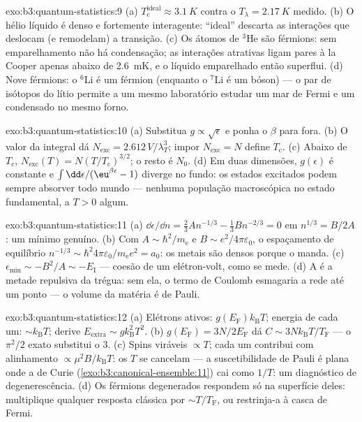 \begin{solution}{exo:b3:quantum-statistics:9}
(a) $T_{\text{c}}^{\text{ideal}} \approx \qty{3.1}{K}$ contra o
$T_\lambda = \qty{2.17}{K}$ medido. (b) O hélio líquido é denso
e fortemente interagente: ``ideal'' descarta as interações que
deslocam (e remodelam) a transição. (c) Os átomos de $^3$He são férmions:
sem emparelhamento não há condensação; as interações atrativas ligam
pares à la Cooper apenas abaixo de \qty{2.6}{mK}, e o líquido emparelhado
então superflui. (d) Nove férmions: o $^6$Li é um férmion (enquanto
o $^7$Li é um bóson) --- o par de isótopos do lítio permite a um mesmo
laboratório estudar um mar de Fermi e um condensado no mesmo forno.
\end{solution}

\begin{solution}{exo:b3:quantum-statistics:10}
(a) Substitua $g \propto \sqrt\epsilon$ e ponha o $\beta$ para fora.
(b) O valor da integral dá $N_{\text{exc}} =
2.612\,V/\lambda_T^3$; impor $N_{\text{exc}} = N$ define
$T_{\text{c}}$. (c) Abaixo de $T_{\text{c}}$, $N_{\text{exc}}(T) =
N(T/T_{\text{c}})^{3/2}$; o resto é $N_0$. (d) Em duas
dimensões, $g(\epsilon)$ é constante e $\int\dd\epsilon/(\eu^{
\beta\epsilon} - 1)$ diverge no fundo: os estados excitados
podem sempre absorver todo mundo --- nenhuma população macroscópica no
estado fundamental, a $T > 0$ algum.
\end{solution}

\begin{solution}{exo:b3:quantum-statistics:11}
(a) $\dd\epsilon/\dd n = \tfrac23 An^{-1/3} - \tfrac13 Bn^{-2/3} =
0$ em $n^{1/3} = B/2A$: um mínimo genuíno. (b) Com $A \sim
\hbar^2/m_{\text{e}}$ e $B \sim e^2/4\pi\varepsilon_0$, o
espaçamento de equilíbrio $n^{-1/3} \sim \hbar^2 4\pi\varepsilon_0/
m_{\text{e}}e^2 = a_0$: os metais são densos porque o 
manda. (c) $\epsilon_{\min} \sim -B^2/A \sim -E_{\text{I}}$
--- coesão de um elétron-volt, como se mede. (d) A 
é a metade repulsiva da trégua: sem ela, o termo de Coulomb
esmagaria a rede até um ponto --- o volume da matéria é de Pauli.
\end{solution}

\begin{solution}{exo:b3:quantum-statistics:12}
(a) Elétrons ativos: $g(E_{\text{F}})k_{\text{B}}T$; energia de cada um:
$\sim k_{\text{B}}T$; derive $E_{\text{extra}} \sim
g k_{\text{B}}^2T^2$. (b) $g(E_{\text{F}}) = 3N/2E_{\text{F}}$
dá $C \sim 3Nk_{\text{B}}T/T_{\text{F}}$ --- o $\pi^2/2$
exato substitui o 3. (c) Spins viráveis $\propto T$; cada um
contribui com alinhamento $\propto \mu^2B/k_{\text{B}}T$: os $T$ se
cancelam --- a suscetibilidade de Pauli é plana onde a de Curie
(\cref{exo:b3:canonical-ensemble:11}) cai como $1/T$: um
diagnóstico de degenerescência. (d) Os férmions degenerados respondem só
na superfície deles: multiplique qualquer resposta clássica por $\sim
T/T_{\text{F}}$, ou restrinja-a à casca de Fermi.
\end{solution}

